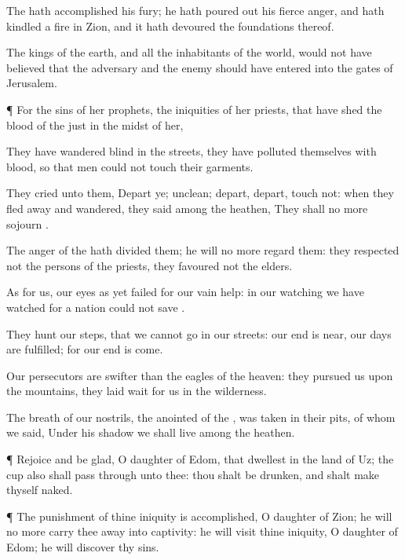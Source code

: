 {The
{} hath
accomplished his
fury; he hath poured
out his
fierce
anger, and hath
kindled a
fire in
Zion, and it hath
devoured the
foundations thereof.

The
kings of the
earth, and all the
inhabitants of the
world, would not have
believed that the
adversary and the
enemy should have
entered into the
gates of
Jerusalem.


\par }{\PP {}¶ For the
sins of her
prophets,
{} the
iniquities of her
priests, that have
shed the
blood of the
just in the
midst of her,

They have
wandered
{}
blind
{} in the
streets, they have
polluted themselves with
blood, so that men
could
not
touch their
garments.

They
cried unto them,
Depart ye;
{}
unclean;
depart,
depart,
touch not: when they fled
away and
wandered, they
said among the
heathen, They shall no
more
sojourn
{}.

The
anger of the
{} hath
divided them; he will no
more
regard them: they
respected not the
persons of the
priests, they
favoured not the
elders.

As for us, our
eyes as yet
failed for our
vain
help: in our
watching we have
watched for a
nation
{} could not
save
{}.

They
hunt our
steps, that we cannot
go in our
streets: our
end is
near, our
days are
fulfilled; for our
end is
come.

Our
persecutors are
swifter than the
eagles of the
heaven: they
pursued us upon the
mountains, they laid
wait for us in the
wilderness.

The
breath of our
nostrils, the
anointed of the
{}, was
taken in their
pits, of whom we
said, Under his
shadow we shall
live among the
heathen.


\par }{\PP {}¶
Rejoice and be
glad, O
daughter of
Edom, that
dwellest in the
land of
Uz; the
cup also shall
pass through unto thee: thou shalt be
drunken, and shalt make thyself
naked.


\par }{\PP {}¶ The punishment of thine
iniquity is
accomplished, O
daughter of
Zion; he will no
more carry thee away into
captivity: he will
visit thine
iniquity, O
daughter of
Edom; he will
discover thy
sins.




}
